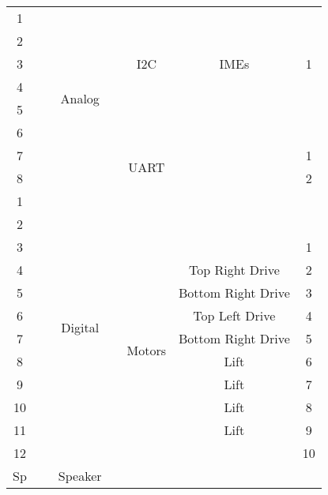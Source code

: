 \begin{center}
\begin{tabular}{| c | c | c | c | c | c | c |}
\hline
1 & ~ %
& \multirow{8}{*}{Analog} & \multicolumn{4}{|c|}{\cellcolor{gray}}\\ \cline{1-2}\cline{4-5}\cline{6-7}
2 & ~ %
& & \multicolumn{4}{|c|}{\cellcolor{gray}}\\ \cline{1-2}\cline{4-5}\cline{6-7}
3 & ~ %
& & \cellcolor{gray} & I2C 
  & IMEs %
& 1\\ \cline{1-2}\cline{4-5}\cline{6-7}
4 & ~ %
& & \multicolumn{4}{|c|}{\cellcolor{gray}}\\ \cline{1-2}\cline{4-5}\cline{6-7}
5 & ~ %
& & \multicolumn{4}{|c|}{\cellcolor{gray}}\\ \cline{1-2}\cline{4-5}\cline{6-7}
6 & ~ %
& & \multicolumn{4}{|c|}{\cellcolor{gray}}\\ \cline{1-2}\cline{4-5}\cline{6-7}
7 & ~ %
& & \cellcolor{gray} & \multirow{2}{*}{UART} 
  & ~ %
& 1\\ \cline{1-2}\cline{4-4}\cline{6-7}
8 & ~ %
& & \cellcolor{gray} & 
  & ~ %
& 2\\ \cline{1-3}\cline{4-5}\cline{6-7}
1 & ~ %
& \multirow{12}{*}{Digital} & \multicolumn{4}{|c|}{\cellcolor{gray}}\\ \cline{1-2}\cline{4-5}\cline{6-7}
2 & ~ %
& & \multicolumn{4}{|c|}{\cellcolor{gray}}\\ \cline{1-2}\cline{4-5}\cline{6-7}
3 & ~ %
& & \cellcolor{gray} & \multirow{10}{*}{Motors} 
  & ~ %
& 1\\  \cline{1-2}\cline{4-4}\cline{6-7}
4 & ~ %
& & \cellcolor{gray} & 
  & Top Right Drive %
& 2\\ \cline{1-2}\cline{4-4}\cline{6-7}
5 & ~ %
& & \cellcolor{gray} & ~ 
  & Bottom Right Drive %
& 3\\ \cline{1-2}\cline{4-4}\cline{6-7}
6 & ~ %
& & \cellcolor{gray} & ~ 
  & Top Left Drive %
& 4\\ \cline{1-2}\cline{4-4}\cline{6-7}
7 & ~ %
& & \cellcolor{gray} & ~ 
  & Bottom Right Drive %
& 5\\ \cline{1-2}\cline{4-4}\cline{6-7}
8 & ~ %
& & \cellcolor{gray} & ~ 
  & Lift %
& 6\\ \cline{1-2}\cline{4-4}\cline{6-7}
9 & ~ %
& & \cellcolor{gray} & ~ 
  & Lift %
& 7\\ \cline{1-2}\cline{4-4}\cline{6-7}
10 & ~ %
& & \cellcolor{gray} & ~ 
   & Lift %
& 8\\ \cline{1-2}\cline{4-4}\cline{6-7}
11 & ~ %
& & \cellcolor{gray} & ~ 
   & Lift %
& 9\\ \cline{1-2}\cline{4-4}\cline{6-7}
12 & ~ %
& & \cellcolor{gray} & ~ 
   & ~ %
& 10\\ \cline{1-3}\cline{4-5}\cline{6-7}
Sp & ~ %
& Speaker & \multicolumn{4}{|c|}{\cellcolor{gray}}\\
\hline
\end{tabular}
\end{center}